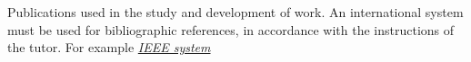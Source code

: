 \begin{thebibliography}{99}
 Publications used in the study and development of work.
An international system must be used for bibliographic references, in accordance with the instructions of the tutor. For example 
\href{https://www.etsiinf.upm.es/docs/estudios/grado/1475_ieeecitationref.pdf}{\emph{IEEE system}}

\end{thebibliography}
